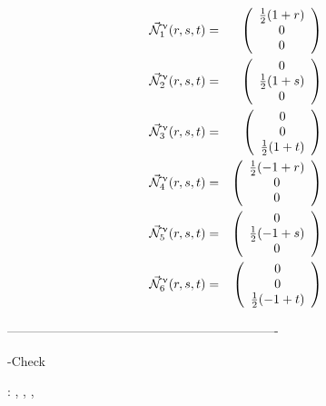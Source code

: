 \begin{mdframed}[backgroundcolor=blue!5]
\begin{eqnarray}
\vec{{\mathcal{N}}}^\upnu_1 (r,s,t) &=& 
\left(\begin{array}{c} \frac12 (1+r) \\ 0 \\ 0\end{array}\right) \nonumber\\
\vec{{\mathcal{N}}}^\upnu_2 (r,s,t) &=& 
\left(\begin{array}{c} 0 \\ \frac12 (1+s) \\0 \end{array}\right) \nonumber\\
\vec{{\mathcal{N}}}^\upnu_3 (r,s,t) &=& 
\left(\begin{array}{c} 0 \\  0 \\\frac12 (1+t)  \end{array}\right) \nonumber\\
\vec{{\mathcal{N}}}^\upnu_4 (r,s,t) &=& 
\left(\begin{array}{c} \frac12 (-1+r) \\ 0 \\ 0 \end{array}\right) \nonumber\\
\vec{{\mathcal{N}}}^\upnu_5 (r,s,t) &=& 
\left(\begin{array}{c} 0 \\ \frac12 (-1+s)  \\ 0 \end{array}\right) \nonumber\\
\vec{{\mathcal{N}}}^\upnu_6 (r,s,t) &=& 
\left(\begin{array}{c} 0 \\ 0 \\\frac12 (-1+t)  \end{array}\right)
\end{eqnarray}
\end{mdframed}



----------------------------------------------------------------

-Check \textcite{brfo}

\Literature: ,
 , , 
